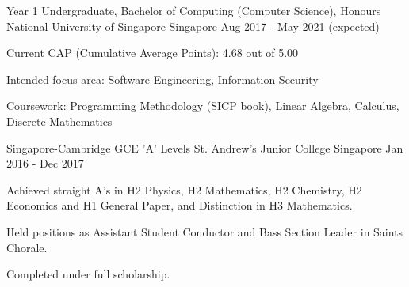 

\begin{cventries}

  \cventry
    {Year 1 Undergraduate, Bachelor of Computing (Computer Science), Honours} %
    {National University of Singapore} %
    {Singapore} %
    {Aug 2017 - May 2021 (expected)} %
    {
      \begin{cvitems} %
        \item {Current CAP (Cumulative Average Points): 4.68 out of 5.00}
        \item {Intended focus area: Software Engineering, Information Security}
        \item {Coursework: Programming Methodology (SICP book), Linear Algebra, Calculus, Discrete Mathematics}
      \end{cvitems}
    }
    
	\cventry
	{Singapore-Cambridge GCE 'A' Levels} %
	{St. Andrew's Junior College} %
	{Singapore} %
	{Jan 2016 - Dec 2017} %
	{
		\begin{cvitems} %
			\item {Achieved straight A's in H2 Physics, H2 Mathematics, H2 Chemistry, H2 Economics and H1 General Paper, and Distinction in H3 Mathematics.}
			\item {Held positions as Assistant Student Conductor and Bass Section Leader in Saints Chorale.}
			\item {Completed under full scholarship.}
		\end{cvitems}
	}
    


\end{cventries}
